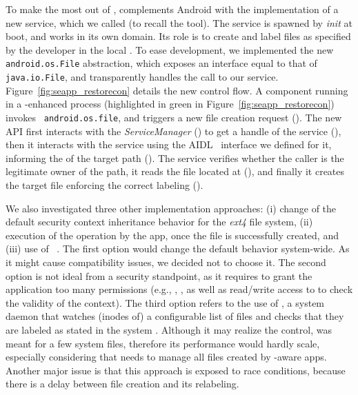 To make the most out of \sel, \seapp complements Android with the
implementation of a new service, which we called \restorecon (to
recall the \sel \restoreconc tool).  The \restorecon service is
spawned by {\em init} at boot, and works in its own \sel domain.  Its
role is to create and label files as specified by the developer in the
local \filecontexts.  To ease development, we implemented the new {\tt
  android.os.File} abstraction, which exposes an interface equal to
that of {\tt java.io.File}, and transparently handles the call to our
service.  Figure~\ref{fig:seapp_restorecon} details the new control
flow.  A component running in a \seapp-enhanced process (highlighted in
green in Figure~\ref{fig:seapp_restorecon}) invokes {\tt
  android.os.file}, and triggers a new file creation request
().  The new API first interacts with the {\em
  ServiceManager} () to get a handle of the \restorecon
service (), then it interacts with the service using
the AIDL~\cite{seapp_aaidl} interface we defined for it, informing the
\restorecon of the target path ().  The \restorecon
service verifies whether the caller is the legitimate owner of the
path, it reads the \filecontexts file located at \dataselinuxdir
(), and finally it creates the target file enforcing
the correct labeling ().

We also investigated three other implementation approaches: (i) change
of the default security context inheritance behavior for the {\em
  ext4} file system, (ii) execution of the \sel \restorecon operation
by the app, once the file is successfully created, and (iii) use of
\restorecond~\cite{seapp_restorecondd}.  The first option would change
the default behavior system-wide.  As it might cause compatibility
issues, we decided not to choose it.  The second option is not ideal
from a security standpoint, as it requires to grant the application
too many permissions (e.g., \relabelfrom, \relabelto, as well as
read/write access to \selinuxfs to check the validity of the \sel
context).  The third option refers to the use of \restorecond, a
system daemon that watches (inodes of) a configurable list of files
and checks that they are labeled as stated in the system
\filecontexts.  Although it may realize the control, \restorecond was
meant for a few system files, therefore its performance would hardly
scale, especially considering that \seapp needs to manage all files
created by \seapp-aware apps.  Another major issue is that this approach
is exposed to race conditions, because there is a delay between file
creation and its relabeling.



